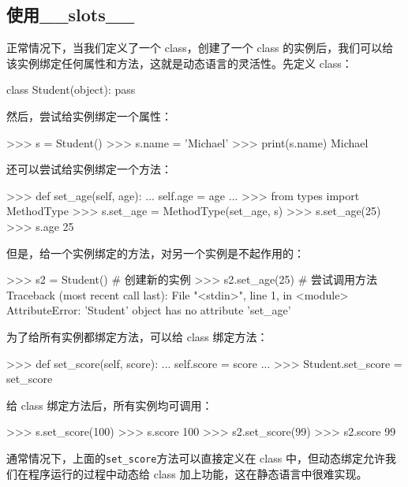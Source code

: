 \hypertarget{ux4f7fux7528__slots__}{%
\subsection{使用\_\_slots\_\_}\label{ux4f7fux7528__slots__}}

正常情况下，当我们定义了一个 class，创建了一个 class
的实例后，我们可以给该实例绑定任何属性和方法，这就是动态语言的灵活性。先定义
class：

\begin{pythoncode}
class Student(object):
    pass
\end{pythoncode}

然后，尝试给实例绑定一个属性：

\begin{pythoncode}
>>> s = Student()
>>> s.name = 'Michael' 
>>> print(s.name)
Michael
\end{pythoncode}

还可以尝试给实例绑定一个方法：

\begin{pythoncode}
>>> def set_age(self, age): 
...     self.age = age
...
>>> from types import MethodType
>>> s.set_age = MethodType(set_age, s) 
>>> s.set_age(25) 
>>> s.age 
25
\end{pythoncode}

但是，给一个实例绑定的方法，对另一个实例是不起作用的：

\begin{pythoncode}
>>> s2 = Student() # 创建新的实例
>>> s2.set_age(25) # 尝试调用方法
Traceback (most recent call last):
  File "<stdin>", line 1, in <module>
AttributeError: 'Student' object has no attribute 'set_age'
\end{pythoncode}

为了给所有实例都绑定方法，可以给 class 绑定方法：

\begin{pythoncode}
>>> def set_score(self, score):
...     self.score = score
...
>>> Student.set_score = set_score
\end{pythoncode}

给 class 绑定方法后，所有实例均可调用：

\begin{pythoncode}
>>> s.set_score(100)
>>> s.score
100
>>> s2.set_score(99)
>>> s2.score
99
\end{pythoncode}

通常情况下，上面的\texttt{set\_score}方法可以直接定义在 class
中，但动态绑定允许我们在程序运行的过程中动态给 class
加上功能，这在静态语言中很难实现。

